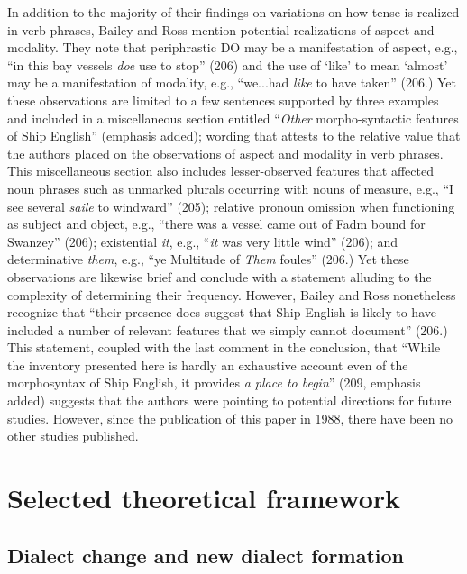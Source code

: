 In addition to the majority of their findings on variations on how tense is realized in verb phrases, Bailey and Ross mention potential realizations of aspect and modality. They note that periphrastic DO may be a manifestation of aspect, e.g., “in this bay vessels \textit{doe} use to stop” (206) and the use of ‘like’ to mean ‘almost’ may be a manifestation of modality, e.g., “we...had \textit{like} to have taken” (206.) Yet these observations are limited to a few sentences supported by three examples and included in a miscellaneous section entitled “\textit{Other} morpho-syntactic features of Ship English” (emphasis added); wording that attests to the relative value that the authors placed on the observations of aspect and modality in verb phrases. This miscellaneous section also includes lesser-observed features that affected noun phrases such as unmarked plurals occurring with nouns of measure, e.g., “I see several \textit{saile} to windward” (205); relative pronoun omission when functioning as subject and object, e.g., “there was a vessel came out of Fadm bound for Swanzey” (206); existential \textit{it}, e.g., “\textit{it} was very little wind” (206); and determinative \textit{them}, e.g., “ye Multitude of \textit{Them} foules” (206.) Yet these observations are likewise brief and conclude with a statement alluding to the complexity of determining their frequency. However, Bailey and Ross nonetheless recognize that “their presence does suggest that Ship English is likely to have included a number of relevant features that we simply cannot document” (206.) This statement, coupled with the last comment in the conclusion, that “While the inventory presented here is hardly an exhaustive account even of the morphosyntax of Ship English, it provides \textit{a place to begin}” (209, emphasis added) suggests that the authors were pointing to potential directions for future studies. However, since the publication of this paper in 1988, there have been no other studies published.  

\section{{Selected} {theoretical} {framework}}%

\subsection{{Dialect} {change} {and} {new} {dialect} {formation} }%


